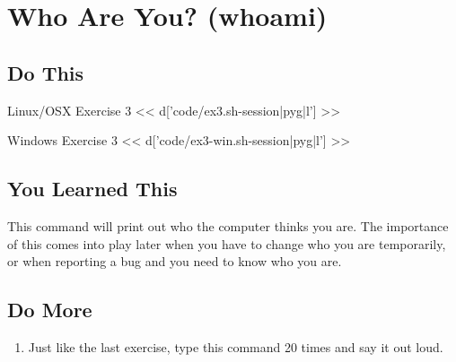 \chapter{Who Are You? (whoami)}

\section{Do This}

\begin{code}{Linux/OSX Exercise 3}
<< d['code/ex3.sh-session|pyg|l'] >>
\end{code}

\begin{code}{Windows Exercise 3}
<< d['code/ex3-win.sh-session|pyg|l'] >>
\end{code}

\section{You Learned This}

This command will print out who the computer thinks you are.  The importance
of this comes into play later when you have to change who you are temporarily,
or when reporting a bug and you need to know who you are.

\section{Do More}

\begin{enumerate}
\item Just like the last exercise, type this command 20 times and say it out loud.
\end{enumerate}

